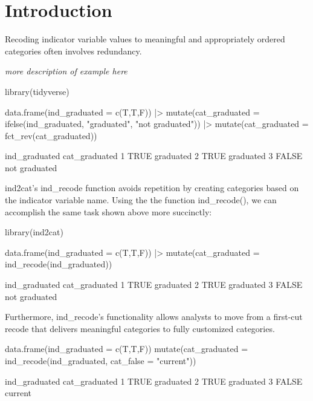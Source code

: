 \hypertarget{introduction}{%
\section{Introduction}\label{introduction}}

Recoding indicator variable values to meaningful and appropriately
ordered categories often involves redundancy.

\emph{more description of example here}

\begin{Schunk}
\begin{Sinput}
library(tidyverse)

data.frame(ind_graduated = c(T,T,F)) |>
  mutate(cat_graduated  = ifelse(ind_graduated, 
                                 "graduated", 
                                 "not graduated")) |>
  mutate(cat_graduated = fct_rev(cat_graduated))  
\end{Sinput}
\begin{Soutput}
       ind_graduated cat_graduated
     1          TRUE     graduated
     2          TRUE     graduated
     3         FALSE not graduated
\end{Soutput}
\end{Schunk}

ind2cat's ind\_recode function avoids repetition by creating categories
based on the indicator variable name. Using the the function
ind\_recode(), we can accomplish the same task shown above more
succinctly:

\begin{Schunk}
\begin{Sinput}
library(ind2cat)

data.frame(ind_graduated = c(T,T,F)) |>
  mutate(cat_graduated  = ind_recode(ind_graduated))
\end{Sinput}
\begin{Soutput}
       ind_graduated cat_graduated
     1          TRUE     graduated
     2          TRUE     graduated
     3         FALSE not graduated
\end{Soutput}
\end{Schunk}

Furthermore, ind\_recode's functionality allows analysts to move from a
first-cut recode that delivers meaningful categories to fully customized
categories.

\begin{Schunk}
\begin{Sinput}
data.frame(ind_graduated = c(T,T,F)) %
  mutate(cat_graduated  = ind_recode(ind_graduated, 
                                     cat_false = "current"))
\end{Sinput}
\begin{Soutput}
       ind_graduated cat_graduated
     1          TRUE     graduated
     2          TRUE     graduated
     3         FALSE       current
\end{Soutput}
\end{Schunk}

